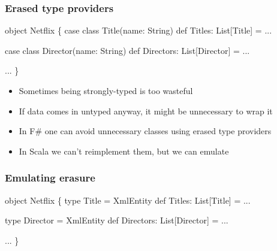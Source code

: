 \documentclass[svgnames,hyperref={bookmarks=false}]{beamer}
\begin{document}
\begin{frame}[fragile, t]
\frametitle{Erased type providers}

\begin{semiverbatim}
object Netflix \{
  case class Title(name: String)
  def Titles: List[Title] = ...

  case class Director(name: String)
  def Directors: List[Director] = ...

  ...
\}

\end{semiverbatim}

\begin{itemize}
\item Sometimes being strongly-typed is too wasteful
\item If data comes in untyped anyway, it might be unnecessary to wrap it
\item In F\# one can avoid unnecessary classes using erased type providers
\item In Scala we can't reimplement them, but we can emulate
\end{itemize}
\end{frame}

\begin{frame}[fragile, t]
\frametitle{Emulating erasure}

\begin{semiverbatim}
object Netflix \{
  type Title = XmlEntity
  def Titles: List[Title] = ...

  type Director = XmlEntity
  def Directors: List[Director] = ...

  ...
\}

\end{semiverbatim}

\begin{itemize}
\end{itemize}
\end{frame}
\end{document}
